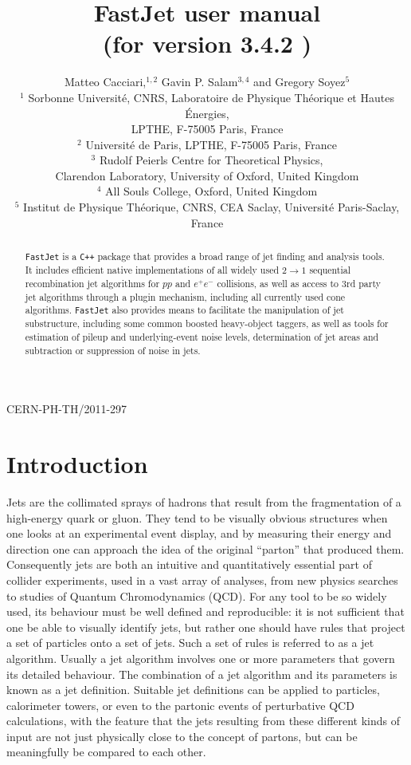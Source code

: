 \documentclass[12pt,a4]{article}
\title{\sf FastJet user manual%
  \\ \large (for version
  3.4.2%
  )
}
\author{Matteo Cacciari,$^{1,2}$ Gavin P. Salam$^{3,4}$ and Gregory Soyez$^{5}$\\[10pt]
  \normalsize
  $^1$ Sorbonne Universit\'e, CNRS, Laboratoire de Physique Th\'eorique et Hautes
  \'Energies,\\[-5pt] \normalsize LPTHE, F-75005 Paris, France\\
    \normalsize
  $^2$ Universit\'e de Paris, LPTHE, F-75005 Paris, France\\
  \normalsize
  $^3$ Rudolf Peierls Centre for Theoretical Physics,\\[-5pt]
  \normalsize
  Clarendon Laboratory, University of Oxford, United Kingdom\\
  \normalsize
  $^4$ All Souls College, Oxford, United Kingdom\\
  \normalsize
  $^5$ Institut de Physique Th\'eorique, CNRS, CEA Saclay, Universit\'e
  Paris-Saclay, France
}
\date{}
\newcommand{\fastjet}{\texttt{FastJet}\xspace}
\newcommand{\ttt}[1]{{\small\texttt{#1}}}
\begin{document}
\maketitle

\vspace{-10cm}
\begin{flushright}
  CERN-PH-TH/2011-297
\end{flushright}
\vspace{9cm}


\begin{abstract}

  \fastjet is a \ttt{C++} package that provides a broad range of jet
  finding and analysis tools.
  It includes efficient native implementations of all widely used $2\to 1$
  sequential recombination jet algorithms for $pp$ and $e^+e^-$
  collisions, as well as access to 3rd party jet algorithms through a
  plugin mechanism, including all currently used cone algorithms.
  \fastjet also provides means to facilitate the manipulation of jet
  substructure, including some common boosted heavy-object taggers, as
  well as tools for estimation of pileup and underlying-event noise
  levels, determination of jet areas and subtraction or suppression
  of noise in jets.

\end{abstract}

\newpage
\tableofcontents
\newpage

\section{Introduction}




Jets are the collimated sprays of hadrons that result from the
fragmentation of a high-energy quark or gluon.
%
They tend to be visually obvious structures when one looks at an
experimental event display, and by measuring their energy and
direction one can approach the idea of the original ``parton'' that
produced them.
%
Consequently jets are both an intuitive and quantitatively essential
part of collider experiments, used in a vast array of analyses, from
new physics searches to studies of Quantum Chromodynamics (QCD).
%
For any tool to be so widely used, its behaviour must be well defined
and reproducible: it is not sufficient that one be able to visually
identify jets, but rather one should have rules that project a set of
particles onto a set of jets.
%
Such a set of rules is referred to as a jet algorithm.
%
Usually a jet algorithm involves one or more parameters that govern
its detailed behaviour.
%
The combination of a jet algorithm and its parameters is known as a
jet definition.
%
Suitable jet definitions can be applied to particles,
calorimeter towers, or even to the partonic events of perturbative QCD
calculations, with the feature that the jets resulting from these
different kinds of input are not just physically close to the
concept of partons, but can be meaningfully be compared to each other.
\end{document}
